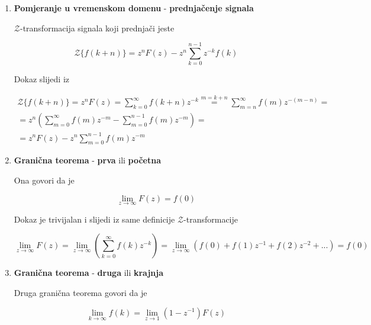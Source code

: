\documentclass[12pt]{IEEEtran}
\numberwithin{equation}{subsection}
\numberwithin{figure}{section}
\begin{document}
\begin{enumerate}
    \item \textbf{Pomjeranje u vremenskom domenu} - \textbf{prednja\v{c}enje signala}
    
    $\mathcal{Z}$-transformacija signala koji prednja\v{c}i jeste

    \begin{equation}
        \mathcal{Z}\{f(k + n)\} = z^{n}F(z) - z^{n}\sum_{k = 0}^{n - 1}{z^{-k}f(k)}
    \end{equation}

    Dokaz slijedi iz 

    \begin{equation}
        \begin{gathered}
            \mathcal{Z}\{f(k + n)\} = z^{n}F(z) = \sum_{k = 0}^{\infty}{f(k + n)z^{-k}} \stackrel{m = k + n}{=} \sum_{m = n}^{\infty}{f(m)z^{-(m - n)}} =\\
            = z^{n}\left(\sum_{m = 0}^{\infty}{f(m)z^{-m}} - \sum_{m = 0}^{n - 1}{f(m)z^{-m}}\right) =\\
            = z^{n}F(z) - z^{n}\sum_{m = 0}^{n - 1}{f(m)z^{-m}}
        \end{gathered}
    \end{equation}

    \newpage
    \item \textbf{Grani\v{c}na teorema} - \textbf{prva} ili \textbf{po\v{c}etna}

    Ona govori da je 

    \begin{equation}
        \lim_{z \to \infty}{F(z)} = f(0)
    \end{equation}

    Dokaz je trivijalan i slijedi iz same definicije $\mathcal{Z}$-transformacije
    
    \begin{equation}
        \lim_{z \to \infty}{F(z)} = \lim_{z \to \infty}{\left(\sum_{k = 0}^{\infty}{f(k)z^{-k}}\right)} = \lim_{z \to \infty}{\left(f(0) + f(1)z^{-1} + f(2)z^{-2} + ...\right)} = f(0)
    \end{equation}

    \item \textbf{Grani\v{c}na teorema} - \textbf{druga} ili \textbf{krajnja}

    Druga grani\v{c}na teorema govori da je 

    \begin{equation}
        \lim_{k \to \infty}{f(k)} = \lim_{z \to 1}{(1 - z^{-1})F(z)}
    \end{equation}


\end{enumerate}
\end{document}
